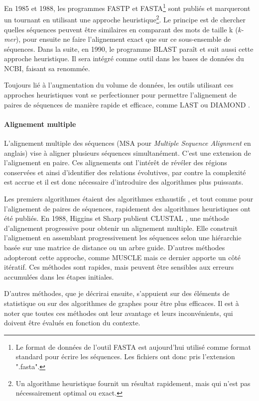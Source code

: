 En 1985 et 1988, les programmes FASTP et FASTA\footnote{Le format de données de l'outil FASTA est aujourd'hui utilisé comme format standard pour écrire les séquences. Les fichiers ont donc pris l'extension ".fasta".} \cite{lipman_rapid_1985,pearson_improved_1988}  sont publiés et marqueront un tournant en utilisant une approche heuristique\footnote{Un algorithme heuristique fournit un résultat rapidement, mais qui n'est pas nécessairement optimal ou exact.}. Le principe est de chercher quelles séquences peuvent être similaires en comparant des mots de taille k (\textit{k-mer}), pour ensuite ne faire l'alignement exact que sur ce sous-ensemble de séquences. Dans la suite, en 1990, le programme BLAST \cite{altschul_basic_1990} paraît et suit aussi cette approche heuristique. Il sera intégré comme outil dans les bases de données du NCBI, faisant sa renommée.  

Toujours lié à l'augmentation du volume de données, les outils utilisant ces approches heuristiques vont se perfectionner pour permettre l'alignement de paires de séquences de manière rapide et efficace, comme LAST \cite{kielbasa_adaptive_2011} ou DIAMOND \cite{buchfink_fast_2015}. 

\newpage
\paragraph{Alignement multiple}
\label{paragraph:MSA}

L'alignement multiple des séquences (MSA pour \textit{Multiple Sequence Alignment} en anglais) vise à aligner plusieurs séquences simultanément. C'est une extension de l'alignement en paire. Ces alignements ont l'intérêt de révéler des régions conservées et ainsi d'identifier des relations évolutives, par contre la complexité est accrue et il est donc nécessaire d'introduire des algorithmes plus puissants.

Les premiers algorithmes étaient des algorithmes exhaustifs \cite{stoye_multiple_1998}, et tout comme pour l'alignement de paires de séquences, rapidement des algorithmes heuristiques ont été publiés. En 1988, Higgins et Sharp publient CLUSTAL \cite{higgins_clustal_1988}, une méthode d'alignement progressive pour obtenir un alignement multiple. Elle construit l’alignement en assemblant progressivement les séquences selon une hiérarchie basée sur une matrice de distance ou un arbre guide. D'autres méthodes adopteront cette approche, comme MUSCLE \cite{edgar_muscle_2004} mais ce dernier apporte un côté itératif. Ces méthodes sont rapides, mais peuvent être sensibles aux erreurs accumulées dans les étapes initiales.

D'autres méthodes, que je décrirai ensuite, s'appuient sur des éléments de statistique ou sur des algorithmes de graphes pour être plus efficaces. Il est à noter que toutes ces méthodes ont leur avantage et leurs inconvénients, qui doivent être évalués en fonction du contexte.